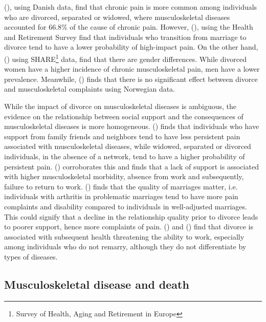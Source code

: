 \documentclass[a4paper,12pt]{article}
\theoremstyle{plain}
\theoremstyle{definition}
\theoremstyle{TheoremNum}
\theoremstyle{CorollaryNum}
\theoremstyle{PropositionNum}
\theoremstyle{TheoremNum}
\begin{document}
\citeauthor{sjogren2009epidemiology} (\citeyear{sjogren2009epidemiology}), using Danish data, find that chronic pain is more common among individuals who are divorced, separated or widowed, where musculoskeletal diseases accounted for 66.8\% of the cause of chronic pain. However, \citeauthor{choi2026marital} (\citeyear{choi2026marital}), using the Health and Retirement Survey find that individuals who transition from marriage to divorce tend to have a lower probability of high-impact pain. On the other hand, \citeauthor{cimas2018chronic} (\citeyear{choi2026marital}) using SHARE\footnote{Survey of Health, Aging and Retirement in Europe} data, find that there are gender differences. While divorced women have a higher incidence of chronic musculoskeletal pain, men have a lower prevalence. Meanwhile, \citeauthor{andorsen2017prospective} (\citeyear{andorsen2017prospective}) finds that there is no significant effect between divorce and musculoskeletal complaints using Norwegian data.

While the impact of divorce on musculoskeletal diseases is ambiguous, the evidence on the relationship between social support and the consequences of musculoskeletal diseases is more homogeneous. \citeauthor*{prang2015recovery} (\citeyear{prang2015recovery}) finds that individuals who have support from family friends and neighbors tend to have less persistent pain associated with musculoskeletal diseases, while widowed, separated or divorced individuals, in the absence of a network, tend to have a higher probability of persistent pain. \citeauthor{woods2005work} (\citeyear{woods2005work}) corroborates this and finds that a lack of support is associated with higher musculoskeletal morbidity, absence from work and subsequently, failure to return to work. \citeauthor{reese2010pain} (\citeyear{reese2010pain}) finds that the quality of marriages matter, i.e. individuals with arthritis in problematic marriages tend to have more pain complaints and disability compared to individuals in well-adjusted marriages. This could signify that a decline in the relationship quality prior to divorce leads to poorer support, hence more complaints of pain. \citeauthor*{couch2015long} (\citeyear{couch2015long}) and \citeauthor*{tamborini2016work} (\citeyear{tamborini2016work}) find that divorce is associated with subsequent health threatening the ability to work, especially among individuals who do not remarry, although they do not differentiate by types of diseases. 


\subsection{Musculoskeletal disease and death}
\end{document}
